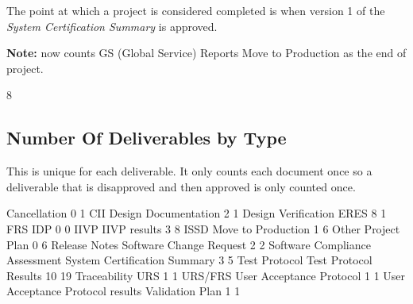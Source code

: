 \documentclass{article}
\begin{document}
The point at which a project is considered completed is when version 1 of the
\textit{System Certification Summary} is approved.

\textbf{Note:} now counts GS (Global Service) Reports Move to Production as the end
of project.

\begin{Schunk}
\begin{Soutput}
[1] 8
\end{Soutput}
\end{Schunk}


\subsection{Number Of Deliverables by Type}
This is unique for each deliverable. It only counts each document once so a deliverable
that is disapproved and then approved is only counted once.

\begin{Schunk}
\begin{Soutput}
                                                     Cancellation 
                               0                                1 
                             CII             Design Documentation 
                               2                                1 
             Design Verification                             ERES 
                               8                                1 
                             FRS                              IDP 
                               0                                0 
                            IIVP                     IIVP results 
                               3                                8 
                            ISSD               Move to Production 
                               1                                6 
                           Other                     Project Plan 
                               0                                6 
                   Release Notes          Software Change Request 
                               2                                2 
  Software Compliance Assessment     System Certification Summary 
                               3                                5 
                   Test Protocol            Test Protocol Results 
                              10                               19 
                    Traceability                              URS 
                               1                                1 
                         URS/FRS         User Acceptance Protocol 
                               1                                1 
User Acceptance Protocol results                  Validation Plan 
                               1                                1 
\end{Soutput}
\end{Schunk}
\end{document}
